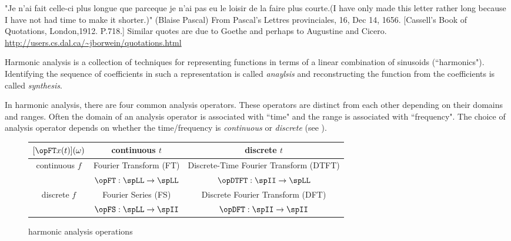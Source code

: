    "Je n'ai fait celle-ci plus longue que parceque je n'ai pas eu le loisir de la faire plus courte.(I have only made this letter rather long because I have not had time to make it shorter.)" 
(Blaise Pascal)
From Pascal's Lettres provinciales, 16, Dec 14, 1656. [Cassell's Book of Quotations, London,1912. P.718.] Similar quotes are due to Goethe and perhaps to Augustine and Cicero.
\url{http://users.cs.dal.ca/~jborwein/quotations.html}



Harmonic analysis is a collection of techniques for
representing functions in terms of a linear combination
of sinusoids (``harmonics").
Identifying the sequence of coefficients in such a representation is called
{\em anaylsis} and reconstructing the function from the coefficients
is called {\em synthesis}.

In harmonic analysis, there are four common analysis operators.
These operators are distinct from each other depending on
their domains and ranges.
Often the domain of an analysis operator is associated with ``time"
and the range is associated with ``frequency".
The choice of analysis operator depends on
whether the time/frequency is {\em continuous} or {\em discrete}
(see ).

\begin{figure}[h]
\begin{center}
   \begin{tabular}{|c||c|c|}
      \hline
      $[\opFT x(t)](\omega)$     &  continuous $t$      & discrete $t$   \\
      \hline
      \hline
         continuous $f$ & Fourier Transform (FT) & Discrete-Time Fourier Transform (DTFT) \\
                        & $\opFT:\spLL\to\spLL$    &  $\opDTFT:\spII\to\spLL$ \\
      \hline
         discrete   $f$ & Fourier Series (FS)  & Discrete Fourier Transform (DFT) \\
                        & $\opFS:\spLL\to\spII$  & $\opDFT:\spII\to\spII$ \\
      \hline
   \end{tabular}
\caption{
   harmonic analysis operations
   \label{fig:fourier}
   }
\end{center}
\end{figure}

